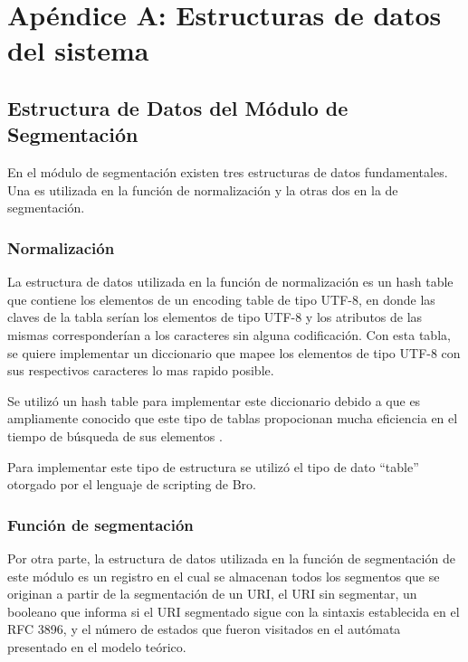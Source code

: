 \chapter{Apéndice A: Estructuras de datos del sistema}
\label{apendiceA}



\section{Estructura de Datos del Módulo de Segmentación}

En el módulo de segmentación existen tres estructuras de datos fundamentales. Una es utilizada en la función de normalización y la otras dos en
la de segmentación.

\subsection*{Normalización}
\label{ssec:estructuraNormalizacion}

La estructura de datos utilizada en la función de normalización es un hash table que contiene los elementos de un encoding table de tipo UTF-8, en donde las claves de la tabla serían los elementos de tipo UTF-8 y los atributos de las mismas corresponderían a los caracteres sin alguna codificación. Con esta tabla, se quiere implementar un diccionario que mapee los elementos de tipo UTF-8 con sus respectivos caracteres lo mas rapido posible.

Se utilizó un hash table para implementar este diccionario debido a que es ampliamente conocido que este tipo de tablas propocionan mucha eficiencia en el tiempo de búsqueda de sus elementos \cite{Cormen}.

Para implementar este tipo de estructura se utilizó el tipo de dato ``table'' otorgado por el lenguaje de scripting de Bro.

\subsection*{Función de segmentación}
\label{ssec:estructuraSegmentacion}

Por otra parte, la estructura de datos utilizada en la función de segmentación de este módulo es un registro en el cual se almacenan todos los segmentos que se originan a partir de la segmentación de un URI, el URI sin segmentar, un booleano que informa si el URI segmentado sigue con la sintaxis establecida en el RFC 3896, y el número de estados que fueron visitados en el autómata presentado en el modelo teórico.
 
